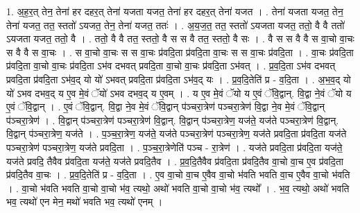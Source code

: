 \documentclass[17pt]{extarticle}
\begin{document}
1. अ॒ह॒र॒त् तेन॒ तेना॑ हर दहर॒त् तेना॑ यजता यजत॒ तेना॑ हर दहर॒त् तेना॑ यजत । . तेना॑ यजता यजत॒ तेन॒ तेना॑ यजत॒ तत॒ स्ततो॑ ऽयजत॒ तेन॒ तेना॑ यजत॒ ततः॑ । . अ॒य॒ज॒त॒ तत॒ स्ततो॑ ऽयजता यजत॒ ततो॒ वै वै ततो॑ ऽयजता यजत॒ ततो॒ वै । . ततो॒ वै वै तत॒ स्ततो॒ वै स स वै तत॒ स्ततो॒ वै सः । . वै स स वै वै स वा॒चो वा॒चः स वै वै स वा॒चः । . स वा॒चो वा॒चः स स वा॒चः प्र॑वदि॒ता प्र॑वदि॒ता वा॒चः स स वा॒चः प्र॑वदि॒ता । . वा॒चः प्र॑वदि॒ता प्र॑वदि॒ता वा॒चो वा॒चः प्र॑वदि॒ता ऽभ॑व दभवत् प्रवदि॒ता वा॒चो वा॒चः प्र॑वदि॒ता ऽभ॑वत् । . प्र॒व॒दि॒ता ऽभ॑व दभवत् प्रवदि॒ता प्र॑वदि॒ता ऽभ॑व॒द् यो यो॑ ऽभवत् प्रवदि॒ता प्र॑वदि॒ता ऽभ॑व॒द् यः । . प्र॒व॒दि॒तेति॑ प्र - व॒दि॒ता । . अ॒भ॒व॒द् यो यो॑ ऽभव दभव॒द् य ए॒व मे॒वं ॅयो॑ ऽभव दभव॒द् य ए॒वम् । . य ए॒व मे॒वं ॅयो य ए॒वं ॅवि॒द्वान्. वि॒द्वा ने॒वं ॅयो य ए॒वं ॅवि॒द्वान् । . ए॒वं ॅवि॒द्वान्. वि॒द्वा ने॒व मे॒वं ॅवि॒द्वान् प॑ञ्चरा॒त्रेण॑ पञ्चरा॒त्रेण॑ वि॒द्वा ने॒व मे॒वं ॅवि॒द्वान् प॑ञ्चरा॒त्रेण॑ । . वि॒द्वान् प॑ञ्चरा॒त्रेण॑ पञ्चरा॒त्रेण॑ वि॒द्वान्. वि॒द्वान् प॑ञ्चरा॒त्रेण॒ यज॑ते॒ यज॑ते पञ्चरा॒त्रेण॑ वि॒द्वान्. वि॒द्वान् प॑ञ्चरा॒त्रेण॒ यज॑ते । . प॒ञ्च॒रा॒त्रेण॒ यज॑ते॒ यज॑ते पञ्चरा॒त्रेण॑ पञ्चरा॒त्रेण॒ यज॑ते प्रवदि॒ता प्र॑वदि॒ता यज॑ते पञ्चरा॒त्रेण॑ पञ्चरा॒त्रेण॒ यज॑ते प्रवदि॒ता । . प॒ञ्च॒रा॒त्रेणेति॑ पञ्च - रा॒त्रेण॑ । . यज॑ते प्रवदि॒ता प्र॑वदि॒ता यज॑ते॒ यज॑ते प्रवदि॒ तैवैव प्र॑वदि॒ता यज॑ते॒ यज॑ते प्रवदि॒तैव । . प्र॒व॒दि॒तैवैव प्र॑वदि॒ता प्र॑वदि॒तैव वा॒चो वा॒च ए॒व प्र॑वदि॒ता प्र॑वदि॒तैव वा॒चः । . प्र॒व॒दि॒तेति॑ प्र - व॒दि॒ता । . ए॒व वा॒चो वा॒च ए॒वैव वा॒चो भ॑वति भवति वा॒च ए॒वैव वा॒चो भ॑वति । . वा॒चो भ॑वति भवति वा॒चो वा॒चो भ॑व॒ त्यथो॒ अथो॑ भवति वा॒चो वा॒चो भ॑व॒ त्यथो᳚ । . भ॒व॒ त्यथो॒ अथो॑ भवति भव॒ त्यथो॑ एन मेन॒ मथो॑ भवति भव॒ त्यथो॑ एनम् । \newline
\end{document}
